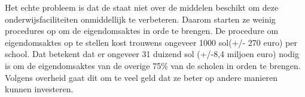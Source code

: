 Het echte probleem is dat de staat niet over de middelen beschikt om deze onderwijsfaciliteiten onmiddellijk te verbeteren. Daarom starten ze weinig procedures op om de eigendomsaktes in orde te brengen. De procedure om eigendomsaktes op te stellen kost trouwens ongeveer 1000 sol(+/- 270 euro) per school. Dat betekent dat er ongeveer 31 duizend sol (+/-8,4 miljoen euro) nodig is om de eigendomsaktes van de overige 75\% van de scholen in orden te brengen. Volgens overheid gaat dit om te veel geld dat ze beter op andere manieren kunnen investeren. \autocite{larepublica2004}
